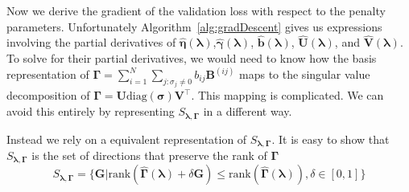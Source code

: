 \documentclass[12pt,letterpaper]{article}
\begin{document}
Now we derive the gradient of the validation loss with respect to the penalty parameters. Unfortunately Algorithm~\ref{alg:gradDescent} gives us expressions involving the partial derivatives of $ \hat{\boldsymbol{\eta}}(\boldsymbol{\lambda})$,$ \hat{\boldsymbol{\gamma}}(\boldsymbol{\lambda})$, $ \hat{\boldsymbol{b}}(\boldsymbol{\lambda})$, $\hat{\boldsymbol{U}}(\boldsymbol{\lambda})$, and $ \hat{\boldsymbol{V}}(\boldsymbol{\lambda})$. To solve for their partial derivatives, we would need to know how the basis representation of $\boldsymbol{\Gamma} =  \sum_{i=1}^N \sum_{j:\sigma_j \ne 0} b_{ij} \boldsymbol{B}^{(ij)}$ maps to the singular value decomposition of $\boldsymbol{\Gamma}= {\boldsymbol{U}} \text{diag}({\boldsymbol{\sigma}}) \boldsymbol{V}^\top$. This mapping is complicated. We can avoid this entirely by representing $S_{\boldsymbol{\lambda}, \boldsymbol{\Gamma}}$ in a different way.

Instead we rely on a equivalent representation of $S_{\boldsymbol{\lambda}, \boldsymbol{\Gamma}}$. It is easy to show that $S_{\boldsymbol{\lambda}, \boldsymbol{\Gamma}}$ is the set of directions that preserve the rank of $\boldsymbol{\Gamma}$
\begin{equation}
S_{\boldsymbol{\lambda}, \boldsymbol{\Gamma}} = \{\boldsymbol{G} | \text{rank}(\hat{\boldsymbol{\Gamma}}(\boldsymbol{\lambda}) + \delta \boldsymbol{G}) \le \text{rank}(\hat{\boldsymbol{\Gamma}}(\boldsymbol{\lambda})), \delta \in [0,1] \}
\label{eq:rank_preserve_diff_space}
\end{equation}

\end{document}
